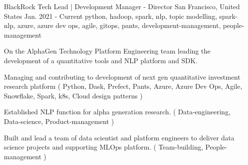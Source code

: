 \cventry
    {BlackRock} %
    {Tech Lead | Development Manager - Director} %
    {San Francisco, United States} %
    {Jan. 2021 - Current} %
    { python, hadoop, spark, nlp, topic modelling, spark-nlp, azure, azure dev ops, agile, gitops, pants, development-management, people-management} %
    {
        On the AlphaGen Technology Platform Engineering team leading the development of a quantitative tools and NLP platform and SDK.
    \begin{cvitems} %
       \item { Managing and contributing to development of next gen quantitative investment research platform ( Python, Dask, Prefect, Pants, Azure, Azure Dev Ops, Agile, Snowflake, Spark, k8s, Cloud design patterns ) }
       \item { Established NLP function for alpha generation research. ( Data-engineering, Data-science, Product-management ) }
       \item { Built and lead a team of data scientist and platform engineers to deliver data science projects and supporting MLOps platform. ( Team-building, People-management ) }
    \end{cvitems}
    }
